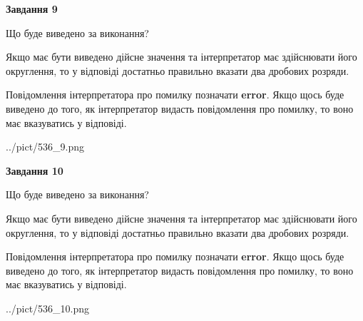 \documentclass[12pt, ukrainian]{article}
\begin{document}
{\begin {Large}
{\begin {center}\textbf{Завдання 9}\end {center}}\par
Що буде виведено за виконання? \par

Якщо має бути виведено дійсне значення та інтерпретатор має здійснювати його округлення, 
то у відповіді достатньо правильно вказати два дробових розряди.

Повідомлення інтерпретатора про помилку позначати \textbf{error}.
Якщо щось буде виведено до того, як інтерпретатор видасть повідомлення про помилку, 
то воно має вказуватись у відповіді. \par

\begin{center}
	{../pict/536_9.png}
\end{center}
\newpage

{\begin {center}\textbf{Завдання 10}\end {center}}\par
Що буде виведено за виконання? \par

Якщо має бути виведено дійсне значення та інтерпретатор має здійснювати його округлення, 
то у відповіді достатньо правильно вказати два дробових розряди.

Повідомлення інтерпретатора про помилку позначати \textbf{error}.
Якщо щось буде виведено до того, як інтерпретатор видасть повідомлення про помилку, 
то воно має вказуватись у відповіді. \par

\begin{center}
	{../pict/536_10.png}
\end{center}
\newpage

\end {Large}}
\end{document}
